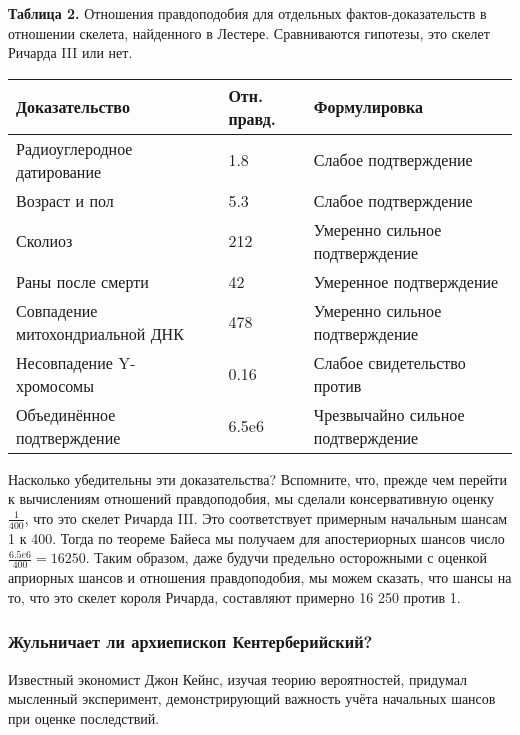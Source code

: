 \documentclass[11pt,a4paper]{article}
\begin{document}
    \textbf{Таблица 2.} Отношения правдоподобия для отдельных
фактов-доказательств в отношении скелета, найденного в Лестере.
Сравниваются гипотезы, это скелет Ричарда III или нет.

\begin{longtable}[]{@{}lll@{}}
\toprule
Доказательство & Отн. правд. & Формулировка \\
\midrule
\endhead
Радиоуглеродное датирование & 1.8 & Слабое подтверждение \\
Возраст и пол & 5.3 & Слабое подтверждение \\
Сколиоз & 212 & Умеренно сильное подтверждение \\
Раны после смерти & 42 & Умеренное подтверждение \\
Совпадение митохондриальной ДНК & 478 & Умеренно сильное
подтверждение \\
Несовпадение Y-хромосомы & 0.16 & Слабое свидетельство против \\
Объединённое подтверждение & 6.5e6 & Чрезвычайно сильное
подтверждение \\
\bottomrule
\end{longtable}

    Насколько убедительны эти доказательства? Вспомните, что, прежде чем
перейти к вычислениям отношений правдоподобия, мы сделали консервативную
оценку \(\frac{1}{400}\), что это скелет Ричарда III. Это соответствует
примерным начальным шансам 1 к 400. Тогда по теореме Байеса мы получаем
для апостериорных шансов число \(\frac{6.5e6}{400} = 16250\). Таким
образом, даже будучи предельно осторожными с оценкой априорных шансов и
отношения правдоподобия, мы можем сказать, что шансы на то, что это
скелет короля Ричарда, составляют примерно 16 250 против 1.

    \hypertarget{ux436ux443ux43bux44cux43dux438ux447ux430ux435ux442-ux43bux438-ux430ux440ux445ux438ux435ux43fux438ux441ux43aux43eux43f-ux43aux435ux43dux442ux435ux440ux431ux435ux440ux438ux439ux441ux43aux438ux439}{%
\subsubsection{Жульничает ли архиепископ
Кентерберийский?}\label{ux436ux443ux43bux44cux43dux438ux447ux430ux435ux442-ux43bux438-ux430ux440ux445ux438ux435ux43fux438ux441ux43aux43eux43f-ux43aux435ux43dux442ux435ux440ux431ux435ux440ux438ux439ux441ux43aux438ux439}}

    Известный экономист Джон Кейнс, изучая теорию вероятностей, придумал
мысленный эксперимент, демонстрирующий важность учёта начальных шансов
при оценке последствий.
\end{document}
